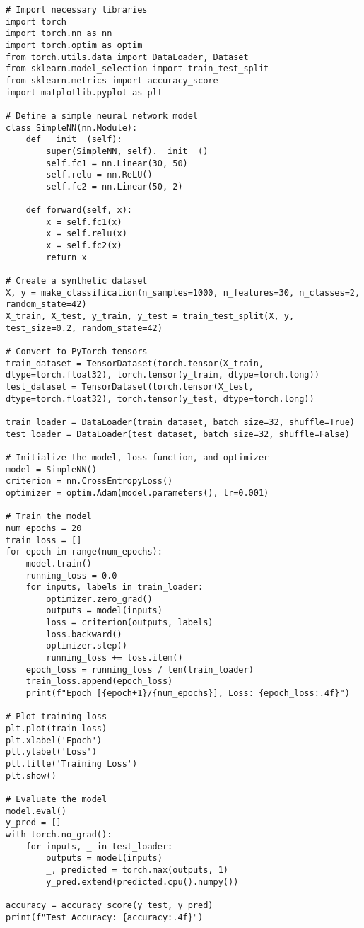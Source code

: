 \begin{verbatim}
# Import necessary libraries
import torch
import torch.nn as nn
import torch.optim as optim
from torch.utils.data import DataLoader, Dataset
from sklearn.model_selection import train_test_split
from sklearn.metrics import accuracy_score
import matplotlib.pyplot as plt

# Define a simple neural network model
class SimpleNN(nn.Module):
    def __init__(self):
        super(SimpleNN, self).__init__()
        self.fc1 = nn.Linear(30, 50)
        self.relu = nn.ReLU()
        self.fc2 = nn.Linear(50, 2)
    
    def forward(self, x):
        x = self.fc1(x)
        x = self.relu(x)
        x = self.fc2(x)
        return x

# Create a synthetic dataset
X, y = make_classification(n_samples=1000, n_features=30, n_classes=2, random_state=42)
X_train, X_test, y_train, y_test = train_test_split(X, y, test_size=0.2, random_state=42)

# Convert to PyTorch tensors
train_dataset = TensorDataset(torch.tensor(X_train, dtype=torch.float32), torch.tensor(y_train, dtype=torch.long))
test_dataset = TensorDataset(torch.tensor(X_test, dtype=torch.float32), torch.tensor(y_test, dtype=torch.long))

train_loader = DataLoader(train_dataset, batch_size=32, shuffle=True)
test_loader = DataLoader(test_dataset, batch_size=32, shuffle=False)

# Initialize the model, loss function, and optimizer
model = SimpleNN()
criterion = nn.CrossEntropyLoss()
optimizer = optim.Adam(model.parameters(), lr=0.001)

# Train the model
num_epochs = 20
train_loss = []
for epoch in range(num_epochs):
    model.train()
    running_loss = 0.0
    for inputs, labels in train_loader:
        optimizer.zero_grad()
        outputs = model(inputs)
        loss = criterion(outputs, labels)
        loss.backward()
        optimizer.step()
        running_loss += loss.item()
    epoch_loss = running_loss / len(train_loader)
    train_loss.append(epoch_loss)
    print(f"Epoch [{epoch+1}/{num_epochs}], Loss: {epoch_loss:.4f}")

# Plot training loss
plt.plot(train_loss)
plt.xlabel('Epoch')
plt.ylabel('Loss')
plt.title('Training Loss')
plt.show()

# Evaluate the model
model.eval()
y_pred = []
with torch.no_grad():
    for inputs, _ in test_loader:
        outputs = model(inputs)
        _, predicted = torch.max(outputs, 1)
        y_pred.extend(predicted.cpu().numpy())

accuracy = accuracy_score(y_test, y_pred)
print(f"Test Accuracy: {accuracy:.4f}")
\end{verbatim}

